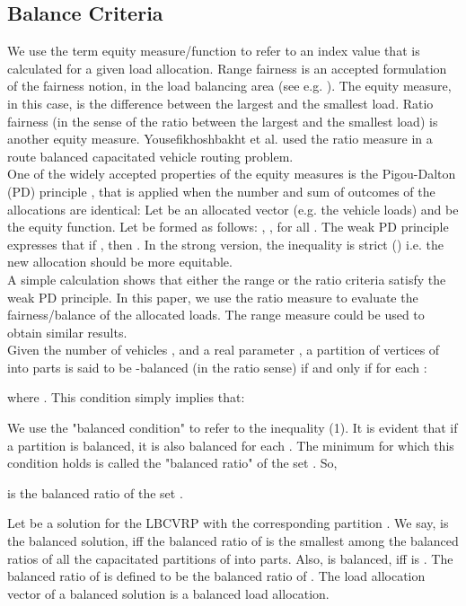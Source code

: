 \subsection{Balance Criteria}
\noindent We use the term equity measure/function to refer to an index value that is calculated for a given load allocation. Range fairness is an accepted formulation of the fairness notion, in the load balancing area (see e.g. \cite{Chen2008,Tsouros}). The equity measure, in this case, is the difference between the largest and the smallest load. Ratio fairness (in the sense of the ratio between the largest and the smallest load) is another equity measure. Yousefikhoshbakht et al. \cite{Yousefikhoshbakht} used the ratio measure in a route balanced capacitated vehicle routing problem. \\
\indent One of the widely accepted properties of the equity measures is the Pigou-Dalton (PD) principle \cite{Cowell}, that is applied when the number and sum of outcomes of the allocations are identical: Let   be an allocated vector (e.g.
 the vehicle loads) and  be the equity function. Let   be formed as follows:  , ,   for all . The weak PD principle expresses that if , then . In the strong version, the inequality is strict () i.e. the new allocation should be more equitable. \\
\indent A simple calculation shows that either the range or the ratio criteria satisfy the weak PD principle. In this paper, we use the ratio measure to evaluate the fairness/balance of the allocated loads. The range measure could be used to obtain similar results. \\
\indent Given the number of vehicles , and a real parameter , a partition of vertices of  into  parts  is said to be -balanced (in the ratio sense) if and only if for each :

\noindent where . This condition simply implies that: 

\indent We use the "balanced condition" to refer to the inequality (1). It is evident that if a partition is balanced, it is also balanced for each . The minimum  for which this condition holds is called the "balanced ratio" of the set . So, 
 
\noindent is the balanced ratio of the set . 
\begin{definition}Let  be a solution for the LBCVRP with the corresponding partition . We say,  is the balanced solution, iff the balanced ratio of  is the smallest among the balanced ratios of all the capacitated partitions of  into  parts. Also,  is balanced, iff  is . The balanced ratio of  is defined to be the balanced ratio of . The load allocation vector of a balanced solution is a balanced load allocation. 
\end{definition}

